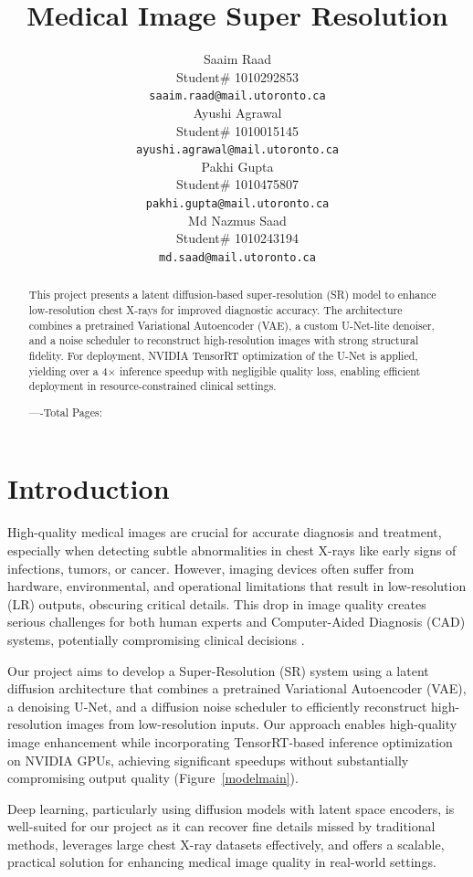 \documentclass{article} %
\title{Medical Image Super Resolution}
\author{Saaim Raad  \\
Student\# 1010292853\\
\texttt{saaim.raad@mail.utoronto.ca} \\
\And
Ayushi Agrawal  \\
Student\# 1010015145 \\
\texttt{ayushi.agrawal@mail.utoronto.ca} \\
\And
Pakhi Gupta  \\
Student\# 1010475807 \\
\texttt{pakhi.gupta@mail.utoronto.ca} \\
\And
Md Nazmus Saad\\
Student\# 1010243194 \\
\texttt{md.saad@mail.utoronto.ca} \\
}
\begin{document}
\maketitle

\begin{abstract}
This project presents a latent diffusion-based super-resolution (SR) model to enhance low-resolution chest X-rays for improved diagnostic accuracy. The architecture combines a pretrained Variational Autoencoder (VAE), a custom U-Net-lite denoiser, and a noise scheduler to reconstruct high-resolution images with strong structural fidelity. For deployment, NVIDIA TensorRT optimization of the U-Net is applied, yielding over a 4$\times$ inference speedup with negligible quality loss, enabling efficient deployment in resource-constrained clinical settings.



----Total Pages: \pageref{last_page}
\end{abstract}



\section{Introduction}

High-quality medical images are crucial for accurate diagnosis and treatment, especially when detecting subtle abnormalities in chest X-rays like early signs of infections, tumors, or cancer. However, imaging devices often suffer from hardware, environmental, and operational limitations that result in low-resolution (LR) outputs, obscuring critical details. This drop in image quality creates serious challenges for both human experts and Computer-Aided Diagnosis (CAD) systems, potentially compromising clinical decisions \citep{Sabina23}.

Our project aims to develop a Super-Resolution (SR) system using a latent diffusion architecture that combines a pretrained Variational Autoencoder (VAE), a denoising U-Net, and a diffusion noise scheduler to efficiently reconstruct high-resolution images from low-resolution inputs. Our approach enables high-quality image enhancement while incorporating TensorRT-based inference optimization on NVIDIA GPUs, achieving significant speedups without substantially compromising output quality (Figure~\ref{modelmain}).

Deep learning, particularly using diffusion models with latent space encoders, is well-suited for our project as it can recover fine details missed by traditional methods, leverages large chest X-ray datasets effectively, and offers a scalable, practical solution for enhancing medical image quality in real-world settings.
\end{document}
